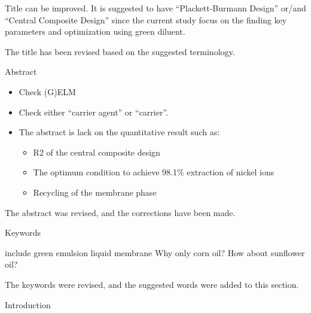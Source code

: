 \documentclass[11pt,answers]{exam}
\begin{document}
\begin{questions}

\question Title can be improved. It is suggested to have “Plackett-Burmann Design” or/and “Central Composite Design” since the current study focus on the finding key parameters and optimization using green diluent.

\begin{solutionorbox}
    The title has been revised based on the suggested terminology.
\end{solutionorbox}


Abstract
\begin{itemize}
    \item Check (G)ELM
    \item Check either “carrier agent” or “carrier”.
    \item The abstract is lack on the quantitative result such as:
    \begin{itemize}
     \item R2 of the central composite design
     \item The optimum condition to achieve 98.1\% extraction of nickel ions
     \item Recycling of the membrane phase
     \end{itemize}
\end{itemize}

\begin{solutionorbox}
    The abstract was revised, and the corrections have been made.
\end{solutionorbox}

Keywords

\question include green emulsion liquid membrane Why only corn oil? How about sunflower oil?

\begin{solutionorbox}
    The keywords were revised, and the suggested words were added to this section.
\end{solutionorbox}

Introduction


\end{questions}
\end{document}
